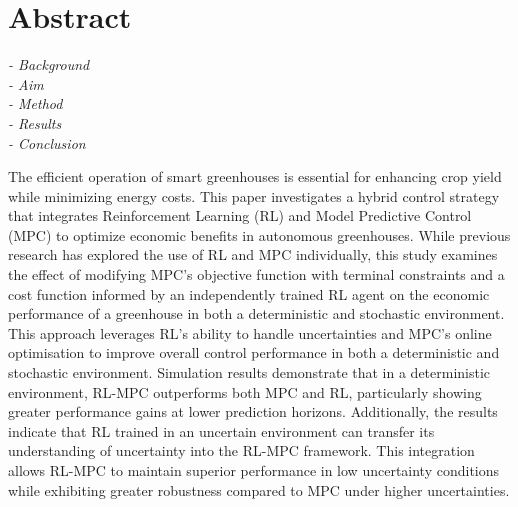 \chapter*{Abstract}

\emph{- Background \\
- Aim \\ 
- Method \\
- Results \\
- Conclusion
}


      The efficient operation of smart greenhouses is essential for enhancing crop yield while minimizing energy costs. This paper investigates a hybrid control strategy that integrates Reinforcement Learning (RL) and Model Predictive Control (MPC) to optimize economic benefits in autonomous greenhouses. While previous research has explored the use of RL and MPC individually, this study examines the effect of modifying MPC’s objective function with terminal constraints and a cost function informed by an independently trained RL agent on the economic performance of a greenhouse in both a deterministic and stochastic environment. This approach leverages RL's ability to handle uncertainties and MPC’s online optimisation to improve overall control performance in both a deterministic and stochastic environment. Simulation results demonstrate that in a deterministic environment, RL-MPC outperforms both MPC and RL, particularly showing greater performance gains at lower prediction horizons. Additionally, the results indicate that RL trained in an uncertain environment can transfer its understanding of uncertainty into the RL-MPC framework. This integration allows RL-MPC to maintain superior performance in low uncertainty conditions while exhibiting greater robustness compared to MPC under higher uncertainties.

